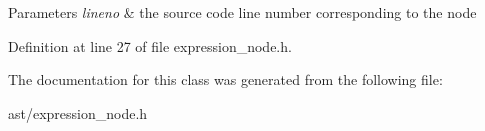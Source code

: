 \begin{DoxyParams}{Parameters}
{\em lineno} & the source code line number corresponding to the node \\
\hline
\end{DoxyParams}


Definition at line 27 of file expression\+\_\+node.\+h.



The documentation for this class was generated from the following file\+:\begin{DoxyCompactItemize}
\item 
ast/expression\+\_\+node.\+h\end{DoxyCompactItemize}
